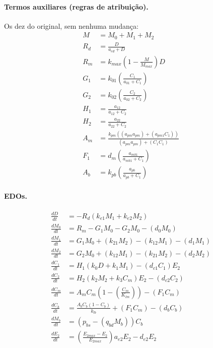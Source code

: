 \documentclass[11pt]{article}
\begin{document}
\paragraph{Termos auxiliares (regras de atribuição).} Os dez do original, sem nenhuma mudança:
\begin{align}
M   &= M_0 + M_1 + M_2 \\
R_d &= \frac{D}{a_{ed} + D} \\
R_m &= k_{max} \left(1 - \frac{M}{M_{max}}\right) D \\
G_1 &= k_{01} \left(\frac{C_1}{a_{01} + C_1}\right) \\
G_2 &= k_{02} \left(\frac{C_2}{a_{02} + C_2}\right) \\
H_1 &= \frac{a_{12}}{a_{12} + C_2} \\
H_2 &= \frac{a_{22}}{a_{22} + C_2} \\
A_m &= \frac{k_{pm} \left((a_{pm} a_{pm}) + (a_{pm1} C_1)\right)}{(a_{pm} a_{pm}) + (C_1 C_1)} \\
F_1 &= d_m \left(\frac{a_{mb1}}{a_{mb1} + C_1}\right) \\
A_b &= k_{pb} \left(\frac{a_{pb}}{a_{pb} + C_1}\right)
\end{align}

\paragraph{EDOs.}
\begin{align}
\frac{dD}{dt}   &= -R_d (k_{e1} M_1 + k_{e2} M_2) \\
\frac{dM_0}{dt} &= R_m - G_1 M_0 - G_2 M_0 - (d_0 M_0) \\
\frac{dM_1}{dt} &= G_1 M_0 + (k_{21} M_2) - (k_{12} M_1) - (d_1 M_1) \\
\frac{dM_2}{dt} &= G_2 M_0 + (k_{12} M_1) - (k_{21} M_2) - (d_2 M_2) \\
\frac{dC_1}{dt} &= H_1 (k_0 D + k_1 M_1) - (d_{c1} C_1) E_2 \\
\frac{dC_2}{dt} &= H_2 (k_2 M_2 + k_3 C_m) E_2 - (d_{c2} C_2) \\
\frac{dC_m}{dt} &= A_m C_m \left(1 - \left(\frac{C_m}{K_{lm}}\right)\right) - (F_1 C_m) \\
\frac{dC_b}{dt} &= \frac{A_b C_b (1 - C_b)}{k_{lb}} + (F_1 C_m) - (d_b C_b) \\
\frac{dM_b}{dt} &= (p_{bs} - (q_{bd} M_b)) C_b \\
\frac{dE_2}{dt} &= \left(\frac{E_{2max} - E_2}{E_{2max}}\right) a_{e2} E_2 - d_{e2} E_2
\end{align}
\end{document}
